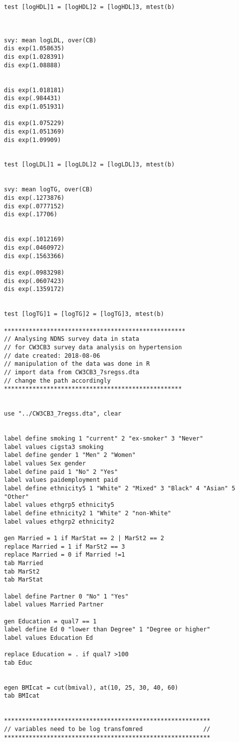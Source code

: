 \documentclass[]{article}
\begin{document}
\begin{verbatim}
test [logHDL]1 = [logHDL]2 = [logHDL]3, mtest(b)



svy: mean logLDL, over(CB)
dis exp(1.058635)
dis exp(1.028391)
dis exp(1.08888)


dis exp(1.018181)  
dis exp(.984431)
dis exp(1.051931)

dis exp(1.075229)
dis exp(1.051369)
dis exp(1.09909)


test [logLDL]1 = [logLDL]2 = [logLDL]3, mtest(b)


svy: mean logTG, over(CB)
dis exp(.1273876)
dis exp(.0777152)
dis exp(.17706)


dis exp(.1012169)  
dis exp(.0460972)
dis exp(.1563366)

dis exp(.0983298)
dis exp(.0607423)
dis exp(.1359172)


test [logTG]1 = [logTG]2 = [logTG]3, mtest(b)

***************************************************
// Analysing NDNS survey data in stata
// for CW3CB3 survey data analysis on hypertension
// date created: 2018-08-06
// manipulation of the data was done in R
// import data from CW3CB3_7sregss.dta
// change the path accordingly
**************************************************


use "../CW3CB3_7regss.dta", clear


label define smoking 1 "current" 2 "ex-smoker" 3 "Never"
label values cigsta3 smoking
label define gender 1 "Men" 2 "Women"
label values Sex gender
label define paid 1 "No" 2 "Yes"
label values paidemployment paid
label define ethnicity5 1 "White" 2 "Mixed" 3 "Black" 4 "Asian" 5 "Other"
label values ethgrp5 ethnicity5
label define ethnicity2 1 "White" 2 "non-White"
label values ethgrp2 ethnicity2

gen Married = 1 if MarStat == 2 | MarSt2 == 2 
replace Married = 1 if MarSt2 == 3
replace Married = 0 if Married !=1
tab Married
tab MarSt2
tab MarStat

label define Partner 0 "No" 1 "Yes"
label values Married Partner

gen Education = qual7 == 1
label define Ed 0 "lower than Degree" 1 "Degree or higher"
label values Education Ed

replace Education = . if qual7 >100
tab Educ


egen BMIcat = cut(bmival), at(10, 25, 30, 40, 60)
tab BMIcat


**********************************************************
// variables need to be log transfomred                 //
**********************************************************


\end{verbatim}
\end{document}
